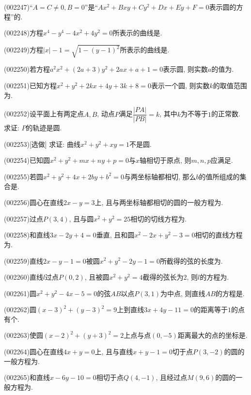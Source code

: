 \item (002247)``$A=C\neq0, B=0$''是``$Ax^2+Bxy+Cy^2+Dx+Ey+F=0$表示圆的方程''的.
\item (002248)方程$x^4-y^4-4x^2+4y^2=0$所表示的曲线是.
\item (002249)方程$|x|-1=\sqrt{1-(y-1)^2}$所表示的曲线是.
\item (002250)若方程$a^2x^2+(2a+3)y^2+2ax+a+1=0$表示圆, 则实数$a$的值为.
\item (002251)已知方程$x^2+y^2+2kx+4y+3k+8=0$表示一个圆, 则实数$k$的取值范围为.
\item (002252)设平面上有两定点$A,B$, 动点$P$满足$\dfrac{|PA|}{|PB|}=k$, 其中$k$为不等于$1$的正常数. 求证: $P$的轨迹是圆.
\item (002253)[选做]
求证: 曲线$x^2+y^2+xy=1$不是圆.
\item (002254)已知圆$x^2+y^2+mx+ny+p=0$与$x$轴相切于原点, 则$m,n,p$应满足.
\item (002255)若圆$x^2+y^2+4x+2by+b^2=0$与两坐标轴都相切, 那么$b$的值所组成的集合是.
\item (002256)圆心在直线$2x-y=3$上, 且与两坐标轴都相切的圆的一般方程为.
\item (002257)过点$P(3,4)$, 且与圆$x^2+y^2=25$相切的切线方程为.
\item (002258)和直线$3x-2y+4=0$垂直, 且和圆$x^2-2x+y^2-3=0$相切的直线方程为.
\item (002259)直线$2x-y-1=0$被圆$x^2+y^2-2y-1=0$所截得的弦的长度为.
\item (002260)直线$l$过点$P(0,2)$, 且被圆$x^2+y^2=4$截得的弦长为$2$, 则$l$的方程为.
\item (002261)圆$x^2+y^2-4x-5=0$的弦$AB$以点$P(3,1)$为中点, 则直线$AB$的方程是.
\item (002262)圆$(x-3)^2+(y-3)^2=9$上到直线$3x+4y-11=0$的距离等于$1$的点有个.
\item (002263)使圆$(x-2)^2+(y+3)^2=2$上点与点$(0,-5)$距离最大的点的坐标是.
\item (002264)圆心在直线$4x+y=0$上, 且与直线$x+y-1=0$切于点$P(3,-2)$的圆的一般方程为.
\item (002265)和直线$x-6y-10=0$相切于点$Q(4,-1)$, 且经过点$M(9,6)$的圆的一般方程为.
